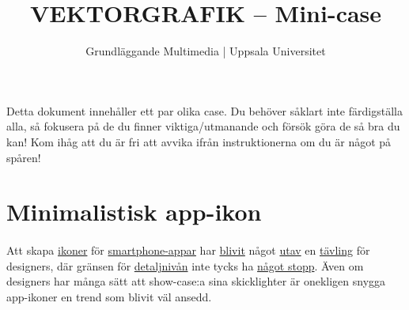 \documentclass{article}
\begin{document}
  \title{ VEKTORGRAFIK -- Mini-case }
  \author{ Grundläggande Multimedia | Uppsala Universitet }
  \date{}
  \maketitle

  \paragraph{}
  Detta dokument innehåller ett par olika case. Du behöver såklart inte färdigställa alla, så fokusera på de du finner viktiga/utmanande och försök göra de så bra du kan! Kom ihåg att du är fri att avvika ifrån instruktionerna om du är något på spåren!


  \newpage
  \section{ Minimalistisk app-ikon }
    \paragraph{}
    Att skapa
    \href{http://dribbble.com/shots/561492-Checklist?list=searches&tag=app_icon}{ikoner}
    för
    \href{http://dribbble.com/shots/1000228-Payment-System-App-Icon/attachments/117809}{smartphone-appar}
    har 
    \href{http://dribbble.com/shots/1040904--Go-Piano-App-Icon-Design}{blivit}
    något
    \href{http://dribbble.com/shots/1001782-New-Fork-App-Icon-Design/attachments/118149}{utav}
    en
    \href{http://dribbble.com/shots/114537-Wunderlist-Icon?list=searches&tag=app_icon}{tävling}
    för designers, där gränsen för
    \href{http://dribbble.com/shots/200993-Boxing-Glove-App-icon?list=searches&tag=app_icon}{detaljnivån}
    inte tycks ha
    \href{http://dribbble.com/shots/824210-waffle-iphone-icon?list=searches&tag=app_icon}{något stopp}.
    Även om designers har många sätt att show-case:a sina skicklighter är onekligen snygga app-ikoner en trend som blivit väl ansedd.
\end{document}
